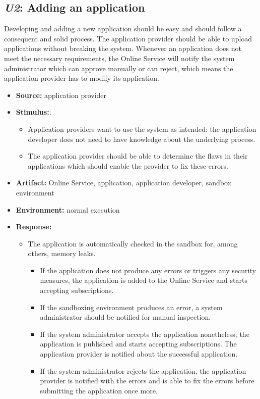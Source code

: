 \documentclass[english]{sareport}
\begin{document}
\subsection{\emph{U2}: Adding an application}
Developing and adding a new application should be easy and should follow a consequent and solid process. The application provider should be able to upload applications without breaking the system. Whenever an application does not meet the necessary requirements, the Online Service will notify the system administrator which can approve manually or can reject, which means the application provider has to modify its application.

\begin{itemize}
    \item \textbf{Source:} application provider
    \item \textbf{Stimulus:}: 
    \begin{itemize}
    \item Application providers want to use the system as intended: the application developer does not need to have knowledge about the underlying process.
    \item The application provider should be able to determine the flaws in their applications which should enable the provider to fix these errors.
    \end{itemize}
    \item \textbf{Artifact:} Online Service, application, application developer, sandbox environment
    \item \textbf{Environment:} normal execution
    \item \textbf{Response:}
        \begin{itemize}
            \item The application is automatically checked in the sandbox for, among others, memory leaks.
            \begin{itemize} 
            \item If the application does not produce any errors or triggers any security measures, the application is added to the Online Service and starts accepting subscriptions.
            \item If the sandboxing environment produces an error, a system administrator should be notified for manual inspection.
            \item If the system administrator accepts the application nonetheless, the application is published and starts accepting subscriptions. The application provider is notified about the successful application.
            \item If the system administrator rejects the application, the application provider is notified with the errors and is able to fix the errors before submitting the application once more.
            \end{itemize}
        \end{itemize}


\end{itemize}
\end{document}
